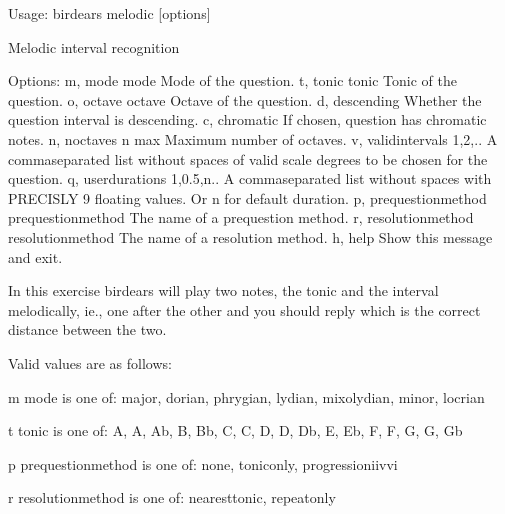 \documentclass[letterpaper,10pt,english]{sphinxmanual}
\begin{document}
%
\begin{sphinxVerbatim}[commandchars=\\\{\}]
Usage: birdears melodic [options]

  Melodic interval recognition

Options:
  \PYGZhy{}m, \PYGZhy{}\PYGZhy{}mode \PYGZlt{}mode\PYGZgt{}               Mode of the question.
  \PYGZhy{}t, \PYGZhy{}\PYGZhy{}tonic \PYGZlt{}tonic\PYGZgt{}             Tonic of the question.
  \PYGZhy{}o, \PYGZhy{}\PYGZhy{}octave \PYGZlt{}octave\PYGZgt{}           Octave of the question.
  \PYGZhy{}d, \PYGZhy{}\PYGZhy{}descending                Whether the question interval is descending.
  \PYGZhy{}c, \PYGZhy{}\PYGZhy{}chromatic                 If chosen, question has chromatic notes.
  \PYGZhy{}n, \PYGZhy{}\PYGZhy{}n\PYGZus{}octaves \PYGZlt{}n max\PYGZgt{}         Maximum number of octaves.
  \PYGZhy{}v, \PYGZhy{}\PYGZhy{}valid\PYGZus{}intervals \PYGZlt{}1,2,..\PYGZgt{}  A comma\PYGZhy{}separated list without spaces
                                  of valid scale degrees to be chosen for the
                                  question.
  \PYGZhy{}q, \PYGZhy{}\PYGZhy{}user\PYGZus{}durations \PYGZlt{}1,0.5,n..\PYGZgt{}
                                  A comma\PYGZhy{}separated list without
                                  spaces with PRECISLY 9 floating values. Or
                                  \PYGZsq{}n\PYGZsq{} for default              duration.
  \PYGZhy{}p, \PYGZhy{}\PYGZhy{}prequestion\PYGZus{}method \PYGZlt{}prequestion\PYGZus{}method\PYGZgt{}
                                  The name of a pre\PYGZhy{}question method.
  \PYGZhy{}r, \PYGZhy{}\PYGZhy{}resolution\PYGZus{}method \PYGZlt{}resolution\PYGZus{}method\PYGZgt{}
                                  The name of a resolution method.
  \PYGZhy{}h, \PYGZhy{}\PYGZhy{}help                      Show this message and exit.

  In this exercise birdears will play two notes, the tonic and the interval
  melodically, ie., one after the other and you should reply which is the
  correct distance between the two.

  Valid values are as follows:

  \PYGZhy{}m \PYGZlt{}mode\PYGZgt{} is one of: major, dorian, phrygian, lydian, mixolydian, minor,
  locrian

  \PYGZhy{}t \PYGZlt{}tonic\PYGZgt{} is one of: A, A\PYGZsh{}, Ab, B, Bb, C, C\PYGZsh{}, D, D\PYGZsh{}, Db, E, Eb, F, F\PYGZsh{}, G,
  G\PYGZsh{}, Gb

  \PYGZhy{}p \PYGZlt{}prequestion\PYGZus{}method\PYGZgt{} is one of: none, tonic\PYGZus{}only, progression\PYGZus{}i\PYGZus{}iv\PYGZus{}v\PYGZus{}i

  \PYGZhy{}r \PYGZlt{}resolution\PYGZus{}method\PYGZgt{} is one of: nearest\PYGZus{}tonic, repeat\PYGZus{}only
\end{sphinxVerbatim}
\end{document}
